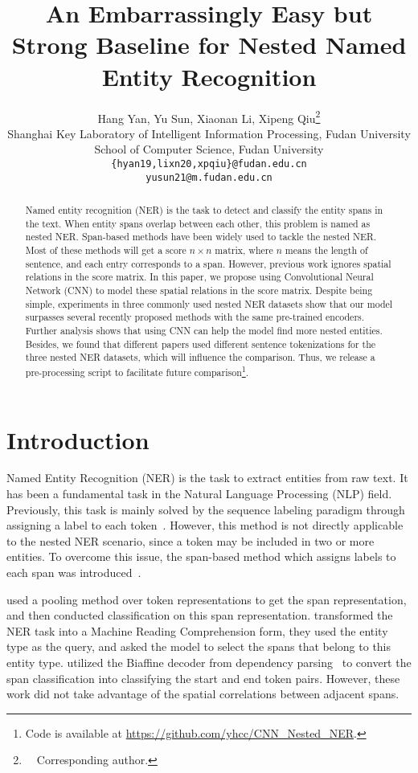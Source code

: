 \documentclass[11pt]{article}
\title{An Embarrassingly Easy but Strong Baseline for Nested Named Entity Recognition}
\author{Hang Yan, Yu Sun, Xiaonan Li, Xipeng Qiu\thanks{\ \  Corresponding author.}\\
  Shanghai Key Laboratory of Intelligent Information Processing, Fudan University \\
  School of Computer Science, Fudan University \\
  \texttt{\{hyan19,lixn20,xpqiu\}@fudan.edu.cn}\\
  \texttt{yusun21@m.fudan.edu.cn}\\}
\begin{document}
\maketitle
\begin{abstract}
  Named entity recognition (NER) is the task to detect and classify the entity spans in the text. When entity spans overlap between each other, this problem is named as nested NER. Span-based methods have been widely used to tackle the nested NER. Most of these methods will get a  score $n \times n$ matrix, where $n$ means the length of sentence, and each entry corresponds to a span. However, previous work ignores spatial relations in the score matrix. In this paper, we propose using Convolutional Neural Network (CNN) to model these spatial relations in the score matrix. Despite being simple, experiments in three commonly used nested NER datasets show that our model surpasses several recently proposed methods with the same pre-trained encoders. Further analysis shows that using CNN can help the model find more nested entities. Besides, we found that different papers used different sentence tokenizations for the three nested NER datasets, which will influence the comparison. Thus, we release a pre-processing script to facilitate future comparison\footnote{Code is available at \url{https://github.com/yhcc/CNN_Nested_NER}.}.
\end{abstract}

\section{Introduction} 




Named Entity Recognition (NER) is the task to extract entities from raw text. 
It has been a fundamental task in the Natural Language Processing (NLP) field. Previously, this task is mainly solved by the sequence labeling paradigm   
through assigning a label to each token~\cite{DBLP:journals/corr/HuangXY15,DBLP:conf/acl/MaH16,DBLP:journals/corr/abs-1911-04474}. However, this method is not directly applicable to the nested NER scenario, since a token may be included in two or more entities. To overcome this issue, the span-based method which assigns labels to each span was introduced~\cite{DBLP:conf/ecai/EbertsU20,DBLP:conf/acl/LiFMHWL20,DBLP:conf/acl/YuBP20}. 

\citet{DBLP:conf/ecai/EbertsU20} used a pooling method over token representations to get the span representation, and then conducted classification on this span representation. \citet{DBLP:conf/acl/LiFMHWL20} transformed the NER task into a Machine Reading Comprehension form, they used the entity type as the query, and asked the model to select the spans that belong to this entity type. \citet{DBLP:conf/acl/YuBP20} utilized the Biaffine decoder from dependency parsing~\cite{DBLP:conf/iclr/DozatM17} to convert the span classification into classifying the start and end token pairs. However, these work did not take advantage of the spatial correlations between adjacent spans. 
\end{document}
